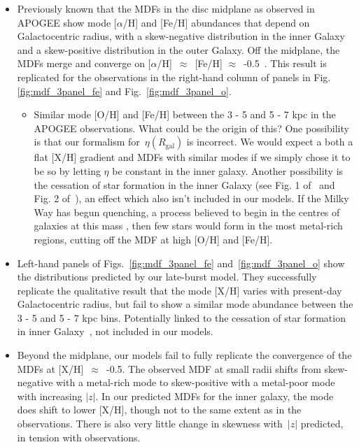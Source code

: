 \documentclass[fleqn, usenatbib]{mnras}
\begin{document}
\begin{itemize} 
	\item Previously known that the MDFs in the disc midplane as observed in 
	APOGEE show mode [$\alpha$/H] and [Fe/H] abundances that depend on 
	Galactocentric radius, with a skew-negative distribution in the inner 
	Galaxy and a skew-positive distribution in the outer Galaxy. Off the 
	midplane, the MDFs merge and converge on [$\alpha$/H]~$\approx$~[Fe/H] 
	$\approx$~-0.5~\citep{Hayden2015, Weinberg2019}. This result is 
	replicated for the observations in the right-hand column of panels in Fig. 
	\ref{fig:mdf_3panel_fe} and Fig.~\ref{fig:mdf_3panel_o}. 
	\begin{itemize} 
		\item Similar mode [O/H] and [Fe/H] between the 3 - 5 and 5 - 7 kpc 
		in the APOGEE observations. What could be the origin of this? One 
		possibility is that our formalism for~$\eta(R_\text{gal})$ is 
		incorrect. We would expect a both a flat [X/H] gradient and MDFs with 
		similar modes if we simply chose it to be so by letting $\eta$ be 
		constant in the inner galaxy. Another possibility is the cessation of 
		star formation in the inner Galaxy (see Fig. 1 of~\citealp{Peek2009} 
		and Fig. 2 of~\citealp{Fraternali2012}), an effect which also isn't 
		included in our models. If the Milky Way has begun quenching, a process 
		believed to begin in the centres of galaxies at this mass 
		\citep[e.g.][]{Ellison2020b}, then few stars would form in the most 
		metal-rich regions, cutting off the MDF at high [O/H] and [Fe/H]. 
	\end{itemize} 

	\item Left-hand panels of Figs.~\ref{fig:mdf_3panel_fe} 
	and~\ref{fig:mdf_3panel_o} show the distributions predicted by our 
	late-burst model. They successfully replicate the qualitative result that 
	the mode [X/H] varies with present-day Galactocentric radius, but fail to 
	show a similar mode abundance between the 3 - 5 and 5 - 7 kpc bins. 
	Potentially linked to the cessation of star formation in inner 
	Galaxy~\citep{Peek2009, Fraternali2012}, not included in our models. 

	\item Beyond the midplane, our models fail to fully replicate the 
	convergence of the MDFs at [X/H]~$\approx$~-0.5. The observed MDF at 
	small radii shifts from skew-negative with a metal-rich mode to 
	skew-positive with a metal-poor mode with increasing $\left|z\right|$. In 
	our predicted MDFs for the inner galaxy, the mode does shift to lower 
	[X/H], though not to the same extent as in the observations. There is also 
	very little change in skewness with~$\left|z\right|$ predicted, in tension 
	with observations. 


\end{itemize}
\end{document}
